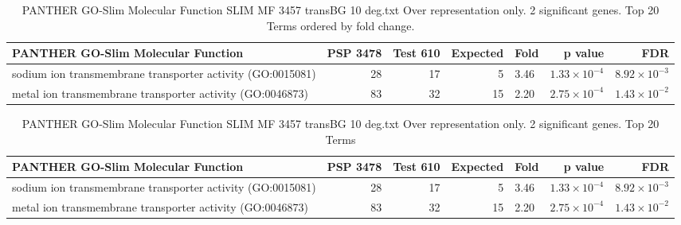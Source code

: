 \begin{table}[ht]
\centering
\begin{adjustbox}{width=\textwidth}
\begin{tabular}{lrrrlrr}
  \hline
PANTHER GO-Slim Molecular Function & PSP 3478 & Test 610 & Expected & Fold & p value & FDR \\ 
  \hline
sodium ion transmembrane transporter activity (GO:0015081) & 28 & 17 & 5 & 3.46 & $1.33 \times 10^{-4}$ & $8.92 \times 10^{-3}$ \\ 
  metal ion transmembrane transporter activity (GO:0046873) & 83 & 32 & 15 & 2.20 & $2.75 \times 10^{-4}$ & $1.43 \times 10^{-2}$ \\ 
   \hline
\end{tabular}
\end{adjustbox}
\caption{PANTHER GO-Slim Molecular Function SLIM MF 3457 transBG 10 deg.txt Over representation only. 2 significant genes. Top 20 Terms ordered by fold change. } 
\label{tab:PANTHER GO-Slim Molecular Function SLIM MF 3457 transBG 10 deg.txt Over representation only. 2 significant genes. Top 20 Terms ordered by fold change. }
\end{table}


\begin{table}[ht]
\centering
\begin{adjustbox}{width=\textwidth}
\begin{tabular}{lrrrlrr}
  \hline
PANTHER GO-Slim Molecular Function & PSP 3478 & Test 610 & Expected & Fold & p value & FDR \\ 
  \hline
sodium ion transmembrane transporter activity (GO:0015081) & 28 & 17 & 5 & 3.46 & $1.33 \times 10^{-4}$ & $8.92 \times 10^{-3}$ \\ 
  metal ion transmembrane transporter activity (GO:0046873) & 83 & 32 & 15 & 2.20 & $2.75 \times 10^{-4}$ & $1.43 \times 10^{-2}$ \\ 
   \hline
\end{tabular}
\end{adjustbox}
\caption{PANTHER GO-Slim Molecular Function SLIM MF 3457 transBG 10 deg.txt Over representation only. 2 significant genes. Top 20 Terms} 
\label{tab:PANTHER GO-Slim Molecular Function SLIM MF 3457 transBG 10 deg.txt Over representation only. 2 significant genes. Top 20 Terms}
\end{table}




